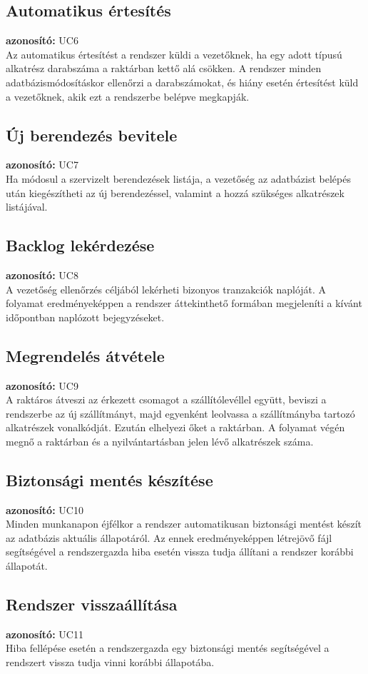 \documentclass[12pt]{article}\usepackage[left=20mm,right=20mm,top=15mm,bottom=20mm]{geometry}
\begin{document}
\subsection{Automatikus értesítés}
\textbf{azonosító: } UC6 \\
Az automatikus értesítést a rendszer küldi a vezetőknek, ha egy adott típusú alkatrész darabszáma a raktárban kettő alá csökken.
A rendszer minden adatbázismódosításkor ellenőrzi a darabszámokat, és hiány esetén értesítést küld a vezetőknek, akik ezt a rendszerbe belépve megkapják.

\subsection{Új berendezés bevitele}
\textbf{azonosító: } UC7 \\
Ha módosul a szervizelt berendezések listája, a vezetőség az adatbázist belépés után kiegészítheti az új berendezéssel, valamint a hozzá szükséges alkatrészek listájával.

\subsection{Backlog lekérdezése}
\textbf{azonosító: } UC8 \\
A vezetőség ellenőrzés céljából lekérheti bizonyos tranzakciók naplóját. 
A folyamat eredményeképpen a rendszer áttekinthető formában megjeleníti a kívánt időpontban naplózott bejegyzéseket.

\subsection{Megrendelés átvétele}
\textbf{azonosító: } UC9 \\
A raktáros átveszi az érkezett csomagot a szállítólevéllel együtt, beviszi a rendszerbe az új szállítmányt, majd egyenként leolvassa a szállítmányba tartozó alkatrészek vonalkódját.
Ezután elhelyezi őket a raktárban.
A folyamat végén megnő a raktárban és a nyilvántartásban jelen lévő alkatrészek száma.

\subsection{Biztonsági mentés készítése}
\textbf{azonosító: } UC10 \\
Minden munkanapon éjfélkor a rendszer automatikusan biztonsági mentést készít az adatbázis aktuális állapotáról.
Az ennek eredményeképpen létrejövő fájl segítségével a rendszergazda hiba esetén vissza tudja állítani a rendszer korábbi állapotát.

\subsection{Rendszer visszaállítása}
\textbf{azonosító: } UC11 \\
Hiba fellépése esetén a rendszergazda egy biztonsági mentés segítségével a rendszert vissza tudja vinni korábbi állapotába.
\end{document}
